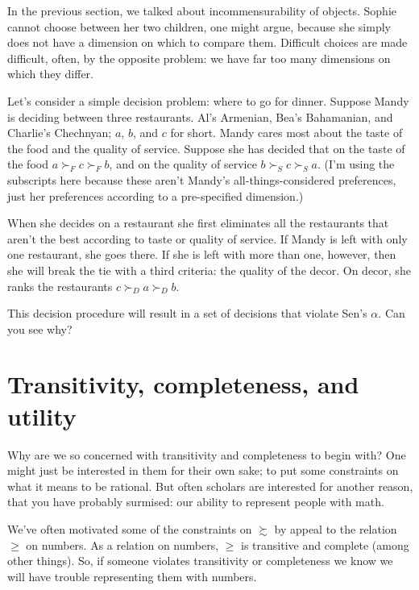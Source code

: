 In the previous section, we talked about incommensurability of objects. Sophie cannot choose between her two children, one might argue, because she simply does not have a dimension on which to compare them.  Difficult choices are made difficult, often, by the opposite problem: we have far too many dimensions on which they differ. 

Let's consider a simple decision problem: where to go for dinner.  Suppose Mandy is deciding between three restaurants.  Al's Armenian, Bea's Bahamanian, and Charlie's Chechnyan; $a$, $b$, and $c$ for short.  Mandy cares most about the taste of the food and the quality of service.  Suppose she has decided that on the taste of the food $a \succ_F c \succ_F b$, and on the quality of service $b \succ_S c \succ_S a$.  (I'm using the subscripts here because these aren't Mandy's all-things-considered preferences, just her preferences according to a pre-specified dimension.)

When she decides on a restaurant she first eliminates all the restaurants that aren't the best according to taste or quality of service.  If Mandy is left with only one restaurant, she goes there.  If she is left with more than one, however, then she will break the tie with a third criteria: the quality of the decor.  On decor, she ranks the restaurants $c \succ_D a \succ_D b$.

This decision procedure will result in a set of decisions that violate Sen's $\alpha$.  Can you see why?

\section{Transitivity, completeness, and utility}

Why are we so concerned with transitivity and completeness to begin with?  One might just be interested in them for their own sake; to put some constraints on what it means to be rational. But often scholars are interested for another reason, that you have probably surmised: our ability to represent people with math.

We've often motivated some of the constraints on $\succsim$ by appeal to the relation $\geq$ on numbers.  As a relation on numbers, $\geq$ is transitive and complete (among other things).  So, if someone violates transitivity or completeness we know we will have trouble representing them with numbers.  

